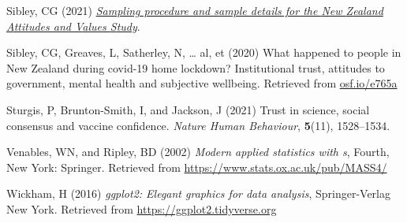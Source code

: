 \documentclass[
  single column]{article}
\newlength{\cslhangindent}
\newenvironment{CSLReferences}[2] %
 {\begin{list}{}{%
  \setlength{\itemindent}{0pt}
  \setlength{\leftmargin}{0pt}
  \setlength{\parsep}{0pt}
  \ifodd #1
   \setlength{\leftmargin}{\cslhangindent}
   \setlength{\itemindent}{-1\cslhangindent}
  \fi
  \setlength{\itemsep}{#2\baselineskip}}}
 {\end{list}}
\begin{document}
\begin{CSLReferences}{1}{0}
Sibley, CG (2021)
\emph{\href{https://doi.org/10.31234/osf.io/wgqvy}{Sampling procedure
and sample details for the {N}ew {Z}ealand {A}ttitudes and {V}alues
{S}tudy}}.

Sibley, CG, Greaves, L, Satherley, N, \ldots{} al, et (2020) What
happened to people in {N}ew {Z}ealand during covid-19 home lockdown?
Institutional trust, attitudes to government, mental health and
subjective wellbeing. Retrieved from
\href{https://osf.io/e765a}{osf.io/e765a}

Sturgis, P, Brunton-Smith, I, and Jackson, J (2021) Trust in science,
social consensus and vaccine confidence. \emph{Nature Human Behaviour},
\textbf{5}(11), 1528--1534.

Venables, WN, and Ripley, BD (2002) \emph{Modern applied statistics with
s}, Fourth, New York: Springer. Retrieved from
\url{https://www.stats.ox.ac.uk/pub/MASS4/}

Wickham, H (2016) \emph{ggplot2: Elegant graphics for data analysis},
Springer-Verlag New York. Retrieved from
\url{https://ggplot2.tidyverse.org}

\end{CSLReferences}
\end{document}

